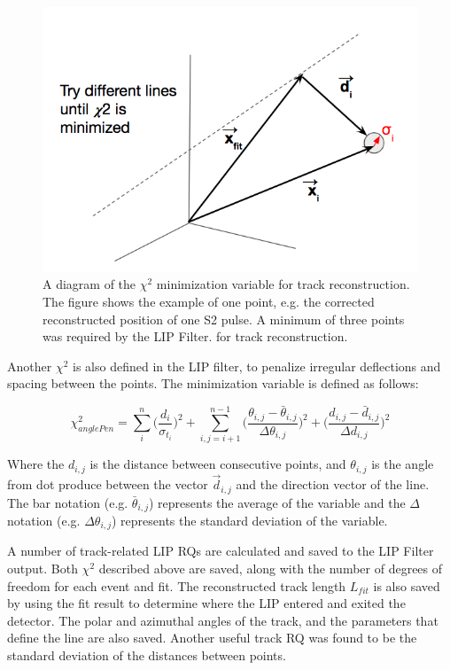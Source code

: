 \begin{figure}[htbp]
\begin{center}
\includegraphics[width=\textwidth]{figures/lips/chi2_diagram.png}
\caption{A diagram of the $\chi^{2}$ minimization variable for track reconstruction. The figure shows the example of one point, e.g. the corrected reconstructed position of one S2 pulse. A minimum of three points was required by the \acs{LIP} Filter. for track reconstruction.   }
\label{fig:chi2_diagram}
\end{center}
\end{figure}

Another $\chi^{2}$ is also defined in the \acs{LIP} filter, to penalize irregular deflections and spacing between the points. The minimization variable is defined as follows:

\begin{equation}
\label{eq:chi2_anglePen}
\chi_{anglePen}^{2} = \sum_{i}^{n} \Big( \frac{d_{i}}{\sigma_{t_{i}}} \Big)^{2} +\sum_{i, j=i+1}^{n-1}  \Big( \frac{\theta_{i,j} - \bar{\theta}_{i,j}}{\Delta \theta_{i,j}} \Big)^{2}+ \Big( \frac{d_{i,j} - \bar{d}_{i,j}}{\Delta d_{i,j}} \Big)^{2}
\end{equation}

Where the $d_{i,j}$ is the distance between consecutive points, and $\theta_{i,j}$ is the angle from dot produce between the vector $\vec{d}_{i,j}$ and the direction vector of the line. The bar notation (e.g. $\bar{\theta}_{i,j}$) represents the average of the variable and the $\Delta$ notation (e.g. $\Delta \theta_{i,j}$) represents the standard deviation of the variable.

A number of track-related \ac{LIP} \ac{RQ}s are calculated and saved to the \ac{LIP} Filter output. Both $\chi^{2}$ described above are saved, along with the number of degrees of freedom for each event and fit. The reconstructed track length $L_{fit}$ is also saved by using the fit result to determine where the \ac{LIP} entered and exited the detector. The polar and azimuthal angles of the track, and the parameters that define the line are also saved. Another useful track \ac{RQ} was found to be the standard deviation of the distances between points. 

